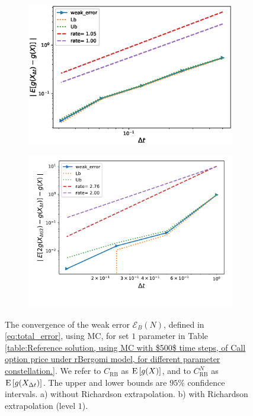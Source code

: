 \begin{figure}[h!]
	\centering
	\begin{subfigure}{.4\textwidth}
		\centering
		\includegraphics[width=1\linewidth]{./figures/rBergomi_weak_error_rates/without_richardson/H_007/weak_convergence_order_Bergomi_H_007_K_1_M_10_6_CI_relative}
		\caption{}
		\label{fig:sub3}
	\end{subfigure}%
	\begin{subfigure}{.4\textwidth}
		\centering
		\includegraphics[width=1\linewidth]{./figures/rBergomi_weak_error_rates/with_richardson/H_007/weak_convergence_order_Bergomi_H_007_K_1_richardson_relative_M_10_6}
		\caption{}
		\label{fig:sub4}
	\end{subfigure}
	
	\caption{The  convergence of the weak error $\mathcal{E}_B(N)$, defined in \eqref{eq:total_error}, using MC, for set $1$ parameter in Table \ref{table:Reference solution, using MC with $500$ time steps, of Call option price under rBergomi model, for different parameter constellation.}. We refer to $C_{\text{RB}}$ as $\mathrm{E}\left[g(X)\right]$, and to $C_{\text{RB}}^{N}$ as  $\mathrm{E}\left[g(X_{\Delta t})\right]$. The upper and lower bounds are $95\%$ confidence intervals. a) without Richardson extrapolation.  b) with Richardson extrapolation (level $1$).}
	\label{fig:Weak_rate_set1_set_2_without_rich}
\end{figure}
\FloatBarrier



